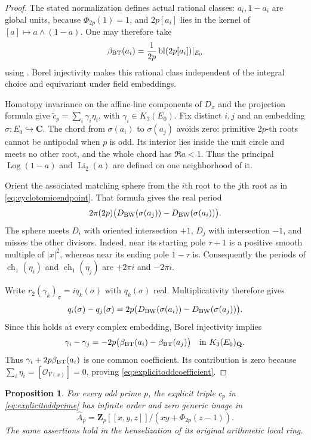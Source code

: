 \documentclass[11pt,a4paper]{article}
\newtheorem{proposition}[theorem]{Proposition}
\theoremstyle{remark}
\newcommand{\Q}{\mathbf Q}
\newcommand{\Z}{\mathbf Z}
\newcommand{\C}{\mathbf C}
\newcommand{\OO}{\mathcal O}
\begin{document}
\begin{proof}
The stated normalization defines actual rational classes:
$a_i,1-a_i$ are global units, because $\Phi_{2p}(1)=1$,
and $2p[a_i]$ lies in the kernel of
$[a]\mapsto a\wedge(1-a)$.
One may therefore take
\[
 \beta_{\rm BT}(a_i)=\frac1{2p}\operatorname{bl}(2p[a_i])|_{E_0}
\]
using \cite[Theorem~4.9 and identification~(4.8)]{BunkeTamme}.
Borel injectivity makes this rational class independent of the
integral choice and equivariant under field embeddings.

Homotopy invariance on the affine-line components of $D_x$ and
the projection formula give
$\widetilde c_p=\sum_i\gamma_i\eta_i$, with
$\gamma_i\in K_3(E_0)$.
Fix distinct $i,j$ and an embedding $\sigma:E_0\hookrightarrow\C$.
The chord from $\sigma(a_i)$ to $\sigma(a_j)$ avoids zero:
primitive $2p$-th roots cannot be antipodal when $p$ is odd.
Its interior lies inside the unit circle and meets no other root,
and the whole chord has $\Re a<1$. Thus the principal
$\operatorname{Log}(1-a)$ and $\operatorname{Li}_2(a)$ are defined
on one neighborhood of it.

Orient the associated matching sphere from the $i$th root to
the $j$th root as in \eqref{eq:cyclotomicendpoint}.
That formula gives the real period
\[
 2\pi(2p)\bigl(D_{\rm BW}(\sigma(a_j))
                  -D_{\rm BW}(\sigma(a_i))\bigr).
\]
The sphere meets $D_i$ with oriented intersection $+1$,
$D_j$ with intersection $-1$, and misses the other divisors.
Indeed, near its starting pole $\tau+1$ is a positive smooth
multiple of $|x|^2$, whereas near its ending pole $1-\tau$ is.
Consequently the periods of $\operatorname{ch}_1(\eta_i)$
and $\operatorname{ch}_1(\eta_j)$ are $+2\pi i$ and $-2\pi i$.

Write $r_2(\gamma_k)_\sigma=iq_k(\sigma)$ with $q_k(\sigma)$ real.
Multiplicativity therefore gives
\[
 q_i(\sigma)-q_j(\sigma)
 =2p\bigl(D_{\rm BW}(\sigma(a_i))
                  -D_{\rm BW}(\sigma(a_j))\bigr).
\]
Since this holds at every complex embedding, Borel injectivity
implies
\[
 \gamma_i-\gamma_j
 =-2p\bigl(\beta_{\rm BT}(a_i)-\beta_{\rm BT}(a_j)\bigr)
 \quad\text{in }K_3(E_0)_{\Q}.
\]
Thus $\gamma_i+2p\beta_{\rm BT}(a_i)$ is one common coefficient.
Its contribution is zero because
$\sum_i\eta_i=[\OO_{V(x)}]=0$, proving
\eqref{eq:explicitoddcoefficient}.
\end{proof}

\begin{proposition}\label{prop:explicitoddcomplete}
For every odd prime $p$, the explicit triple $c_p$ in
\eqref{eq:explicitoddprime} has infinite order and zero generic
image in
\[
 \widehat A_p=\Z_p[[x,y,z]]/(xy+\Phi_{2p}(z-1)).
\]
The same assertions hold in the henselization of its original
arithmetic local ring.
\end{proposition}
\end{document}
